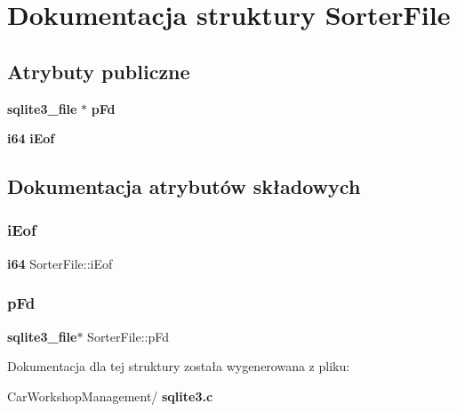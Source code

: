 \section{Dokumentacja struktury Sorter\+File}
\label{struct_sorter_file}
\subsection*{Atrybuty publiczne}
\begin{DoxyCompactItemize}
\item 
\textbf{ sqlite3\+\_\+file} $\ast$ \textbf{ p\+Fd}
\item 
\textbf{ i64} \textbf{ i\+Eof}
\end{DoxyCompactItemize}


\subsection{Dokumentacja atrybutów składowych}
\mbox{\label{struct_sorter_file_a5c5f37fc8b5c432d8bf30eb6e40f7823}} 
\subsubsection{iEof}
{\footnotesize\ttfamily \textbf{ i64} Sorter\+File\+::i\+Eof}

\mbox{\label{struct_sorter_file_afa23123282380b8d04b943479cabadef}} 
\subsubsection{pFd}
{\footnotesize\ttfamily \textbf{ sqlite3\+\_\+file}$\ast$ Sorter\+File\+::p\+Fd}



Dokumentacja dla tej struktury została wygenerowana z pliku\+:\begin{DoxyCompactItemize}
\item 
Car\+Workshop\+Management/\textbf{ sqlite3.\+c}\end{DoxyCompactItemize}
